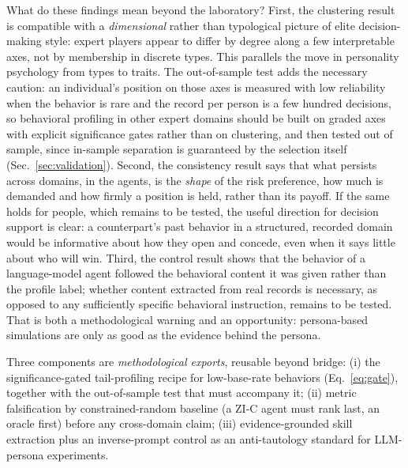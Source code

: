 \documentclass[runningheads]{llncs}
\begin{document}
What do these findings mean beyond the laboratory? First, the
clustering result is compatible with a \emph{dimensional} rather than
typological picture of elite decision-making style: expert players
appear to differ by degree along a few interpretable axes, not by
membership in discrete types. This parallels the move in personality
psychology from types to traits. The out-of-sample test adds the
necessary caution: an individual's position on those axes is measured
with low reliability when the behavior is rare and the record per
person is a few hundred decisions, so behavioral profiling in other
expert domains should be built on graded axes with explicit
significance gates rather than on clustering, and then tested out of
sample, since in-sample separation is guaranteed by the selection
itself (Sec.~\ref{sec:validation}). Second, the consistency
result says that what persists across domains, in the agents, is the
\emph{shape} of the risk preference, how much is demanded and how
firmly a position is held, rather than its payoff. If the same holds
for people, which remains to be tested, the useful direction for
decision support is clear: a counterpart's past behavior in a
structured, recorded domain would be informative about how they open
and concede, even when it says little about who will win. Third, the
control result shows
that the behavior of a language-model agent followed the behavioral
content it was given rather than the profile label; whether content
extracted from real records is necessary, as opposed to any
sufficiently specific behavioral instruction, remains to be tested.
That is both a methodological warning and an opportunity: persona-based
simulations are only as good as the evidence behind the persona.

Three components are \emph{methodological exports}, reusable beyond
bridge: (i) the significance-gated tail-profiling recipe for
low-base-rate behaviors (Eq.~\ref{eq:gate}), together with the
out-of-sample test that must accompany it; (ii) metric falsification
by constrained-random baseline (a ZI-C agent must rank last, an oracle
first) before any cross-domain claim; (iii) evidence-grounded skill
extraction plus an inverse-prompt control as an anti-tautology standard
for LLM-persona experiments.
\end{document}
